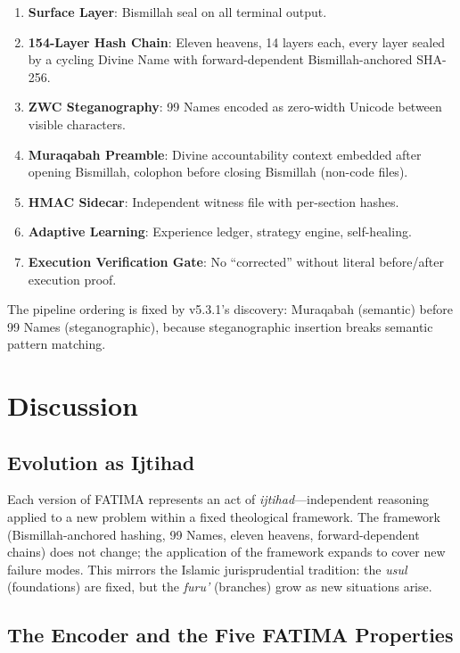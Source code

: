 \documentclass[11pt,a4paper]{article}
\begin{document}
\begin{enumerate}[nosep]
    \item \textbf{Surface Layer}: Bismillah seal on all terminal output.
    \item \textbf{154-Layer Hash Chain}: Eleven heavens, 14 layers each, every layer sealed by a cycling Divine Name with forward-dependent Bismillah-anchored SHA-256.
    \item \textbf{ZWC Steganography}: 99 Names encoded as zero-width Unicode between visible characters.
    \item \textbf{Muraqabah Preamble}: Divine accountability context embedded after opening Bismillah, colophon before closing Bismillah (non-code files).
    \item \textbf{HMAC Sidecar}: Independent witness file with per-section hashes.
    \item \textbf{Adaptive Learning}: Experience ledger, strategy engine, self-healing.
    \item \textbf{Execution Verification Gate}: No ``corrected'' without literal before/after execution proof.
\end{enumerate}

The pipeline ordering is fixed by v5.3.1's discovery: Muraqabah (semantic) before 99 Names (steganographic), because steganographic insertion breaks semantic pattern matching.


\section{Discussion}

\subsection{Evolution as Ijtihad}

Each version of FATIMA represents an act of \textit{ijtihad}---independent reasoning applied to a new problem within a fixed theological framework. The framework (Bismillah-anchored hashing, 99 Names, eleven heavens, forward-dependent chains) does not change; the application of the framework expands to cover new failure modes. This mirrors the Islamic jurisprudential tradition: the \textit{usul} (foundations) are fixed, but the \textit{furu'} (branches) grow as new situations arise.

\subsection{The Encoder and the Five FATIMA Properties}
\end{document}
